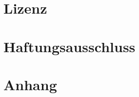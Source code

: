 \documentclass[a4paper]{scrartcl}
\begin{document}
	\section{Lizenz}
	
	\vspace{0.5cm}
	\section{Haftungsausschluss}	
	
	\newpage

	\listoffigures

	\listoftables

	\lstlistoflistings
	\newpage

	\section{Anhang}
	
\end{document}
